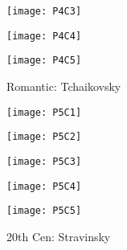 \begin{figure}
\centering
\begin{minipage}{.5\textwidth}
  \centering
  \texttt{[image: P4C3]}
  \label{fig:test1}
\end{minipage}%
\begin{minipage}{.5\textwidth}
  \centering
  \texttt{[image: P4C4]}
  \label{fig:test2}
\end{minipage}
\end{figure}

\begin{figure}[h]
\caption{Romantic: Tchaikovsky}
\centering
\texttt{[image: P4C5]}
\end{figure}

\begin{figure}
\centering
\begin{minipage}{.5\textwidth}
  \centering
  \texttt{[image: P5C1]}
  \label{fig:test1}
\end{minipage}%
\begin{minipage}{.5\textwidth}
  \centering
  \texttt{[image: P5C2]}
  \label{fig:test2}
\end{minipage}
\end{figure}

\begin{figure}
\centering
\begin{minipage}{.5\textwidth}
  \centering
  \texttt{[image: P5C3]}
  \label{fig:test1}
\end{minipage}%
\begin{minipage}{.5\textwidth}
  \centering
  \texttt{[image: P5C4]}
  \label{fig:test2}
\end{minipage}
\end{figure}

\begin{figure}[h]
\caption{20th Cen: Stravinsky}
\centering
\texttt{[image: P5C5]}
\end{figure}